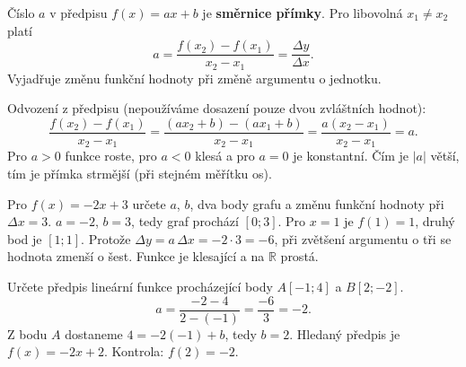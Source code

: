 \documentclass[11pt,a4paper]{article}
\begin{document}
\begin{definiceBox}[title={Definice - Směrnice lineární funkce}]
Číslo $a$ v předpisu $f(x)=ax+b$ je \textbf{směrnice přímky}. Pro libovolná
$x_1\ne x_2$ platí
\[
 a=\frac{f(x_2)-f(x_1)}{x_2-x_1}=\frac{\Delta y}{\Delta x}.
\]
Vyjadřuje změnu funkční hodnoty při změně argumentu o jednotku.
\end{definiceBox}
Odvození z předpisu (nepoužíváme dosazení pouze dvou zvláštních hodnot):
\[
\frac{f(x_2)-f(x_1)}{x_2-x_1}
=\frac{(ax_2+b)-(ax_1+b)}{x_2-x_1}
=\frac{a(x_2-x_1)}{x_2-x_1}=a.
\]
Pro $a>0$ funkce roste, pro $a<0$ klesá a pro $a=0$ je konstantní.
Čím je $|a|$ větší, tím je přímka strmější (při stejném měřítku os).

\begin{center}
\end{center}

\begin{prikladReseniBox}[title={Příklad 1}]
Pro $f(x)=-2x+3$ určete $a$, $b$, dva body grafu a změnu funkční hodnoty při $\Delta x=3$.
\tcblower
$a=-2$, $b=3$, tedy graf prochází $[0;3]$. Pro $x=1$ je $f(1)=1$, druhý bod je $[1;1]$.
Protože $\Delta y=a\,\Delta x=-2\cdot3=-6$, při zvětšení argumentu o tři se hodnota
zmenší o šest. Funkce je klesající a na $\mathbb R$ prostá.
\end{prikladReseniBox}
\begin{prikladReseniBox}[title={Příklad 2}]
Určete předpis lineární funkce procházející body $A[-1;4]$ a $B[2;-2]$.
\tcblower
\[
 a=\frac{-2-4}{2-(-1)}=\frac{-6}{3}=-2.
\]
Z bodu $A$ dostaneme $4=-2(-1)+b$, tedy $b=2$.
Hledaný předpis je $f(x)=-2x+2$. Kontrola: $f(2)=-2$.
\end{prikladReseniBox}
\end{document}
